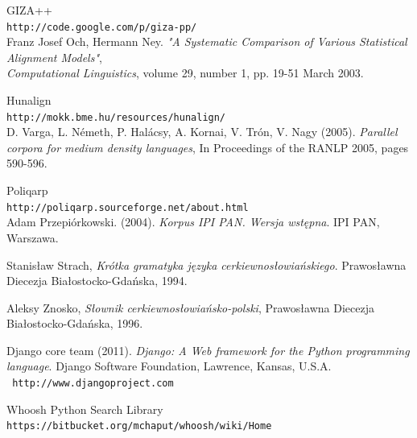 \documentclass{pracamgr}
\begin{document}
\begin{thebibliography}{99}
 GIZA++\\
  {\tt http://code.google.com/p/giza-pp/}\\
  Franz Josef Och, Hermann Ney. \textit{"A Systematic Comparison of
  Various Statistical Alignment Models"},\\ \textit{Computational
  Linguistics}, volume 29, number 1, pp. 19-51 March 2003.

 Hunalign\\
  {\tt http://mokk.bme.hu/resources/hunalign/}\\
  D. Varga, L. Németh, P. Halácsy, A. Kornai, V. Trón, V. Nagy (2005).
  \textit{Parallel corpora for medium density languages},
  In Proceedings of the RANLP 2005, pages 590-596.

 Poliqarp\\
  {\tt http://poliqarp.sourceforge.net/about.html}\\
  Adam Przepiórkowski. (2004). \textit{Korpus IPI PAN. Wersja
  wstępna}. IPI PAN, Warszawa.

 Stanisław Strach, \textit{Krótka gramatyka języka
  cerkiewno\-{}słowiańskiego}. Prawosławna Diecezja Białostocko-Gdańska,
  1994.

 Aleksy Znosko, \textit{Słownik
  cerkiewno\-{}słowiańsko-polski}, Prawosławna Diecezja
  Białostocko-Gdańska, 1996.

 Django core team (2011). \textit{Django: A Web
  framework for the Python programming language}. Django Software
  Foundation, Lawrence, Kansas, U.S.A. \\{\tt
    http://www.djangoproject.com}

 Whoosh Python Search Library\\
  {\tt https://bitbucket.org/mchaput/whoosh/wiki/Home}

\end{thebibliography}
\end{document}
